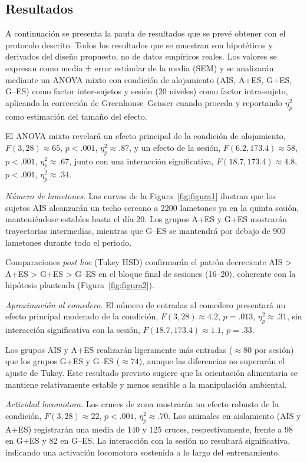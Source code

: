 \documentclass[12pt,a4paper]{article}
\begin{document}
\begin{multicols}{2}
\section{Resultados}

A continuación se presenta la pauta de resultados que se prevé obtener con el protocolo descrito. Todos los resultados que se muestran son hipotéticos y derivados del diseño propuesto, no de datos empíricos reales. Los valores se expresan como media ± error estándar de la media (SEM) y se analizarán mediante un ANOVA mixto con condición de alojamiento (AIS, A+ES, G+ES, G--ES) como factor inter-sujetos y sesión (20 niveles) como factor intra-sujeto, aplicando la corrección de Greenhouse–Geisser cuando proceda y reportando $\eta^2_p$ como estimación del tamaño del efecto.

El ANOVA mixto revelará un efecto principal de la condición de alojamiento, $F(3, 28) \approx 65$, $p < .001$, $\eta^2_p \approx .87$, y un efecto de la sesión, $F(6.2, 173.4) \approx 58$, $p < .001$, $\eta^2_p \approx .67$, junto con una interacción significativa, $F(18.7, 173.4) \approx 4.8$, $p < .001$, $\eta^2_p \approx .34$.

\textit{Número de lametones.} Las curvas de la Figura~\ref{fig:figura1} ilustran que los sujetos AIS alcanzarán un techo cercano a 2200 lametones ya en la quinta sesión, manteniéndose estables hasta el día 20. Los grupos A+ES y G+ES mostrarán trayectorias intermedias, mientras que G--ES se mantendrá por debajo de 900 lametones durante todo el periodo.

Comparaciones \textit{post hoc} (Tukey HSD) confirmarán el patrón decreciente AIS > A+ES > G+ES > G--ES en el bloque final de sesiones (16–20), coherente con la hipótesis planteada (Figura~\ref{fig:figura2}).

\textit{Aproximación al comedero.} El número de entradas al comedero presentará un efecto principal moderado de la condición, $F(3, 28) \approx 4.2$, $p = .013$, $\eta^2_p \approx .31$, sin interacción significativa con la sesión, $F(18.7, 173.4) \approx 1.1$, $p = .33$.

Los grupos AIS y A+ES realizarán ligeramente más entradas ($\approx 80$ por sesión) que los grupos G+ES y G--ES ($\approx 74$), aunque las diferencias no superarán el ajuste de Tukey. Este resultado previsto sugiere que la orientación alimentaria se mantiene relativamente estable y menos sensible a la manipulación ambiental.

\textit{Actividad locomotora.} Los cruces de zona mostrarán un efecto robusto de la condición, $F(3, 28) \approx 22$, $p < .001$, $\eta^2_p \approx .70$. Los animales en aislamiento (AIS y A+ES) registrarán una media de 140 y 125 cruces, respectivamente, frente a 98 en G+ES y 82 en G--ES. La interacción con la sesión no resultará significativa, indicando una activación locomotora sostenida a lo largo del entrenamiento.


\end{multicols}
\end{document}
